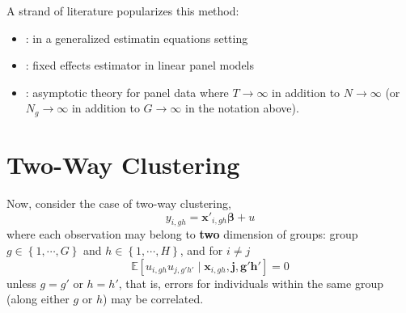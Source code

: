 \documentclass[twoside]{article}
\begin{document}
A strand of literature popularizes 
this method:
\begin{itemize}
    \item \citet{liang1986longitudinal}: in a generalized estimatin equations setting
    \item \citet{arellano1987computing}: fixed effects estimator in linear panel models
    \item \citet{hansen2007asymptotic}: asymptotic theory for panel data where $T\rightarrow\infty$ in addition to $N\rightarrow\infty$ (or $N_g\rightarrow\infty$ in addition to $G\rightarrow\infty$ in the notation above).
\end{itemize}

\section{Two-Way Clustering}
Now, consider the case of two-way clustering, 
$$
y_{i,gh} = \mathbf{x}'_{i,gh}\boldsymbol{\beta} + u
$$
where each observation may belong to \textbf{two} dimension of groups: group $g\in \left\{1,\cdots,G\right\}$ and $h\in \left\{ 1,\cdots,H \right\}$, and for $i\neq j$
\begin{equation}\label{eq:twoway_errors}
    \mathbb{E} \left[ u_{i,gh} u_{j,g'h'} \mid \mathbf{x}_{i,gh},\mathbf{j,g'h'} \right] = 0
\end{equation}
unless $g=g'$ or $h=h'$, that is, errors for individuals within the same group (along either $g$ or $h$) may be correlated.
\end{document}
